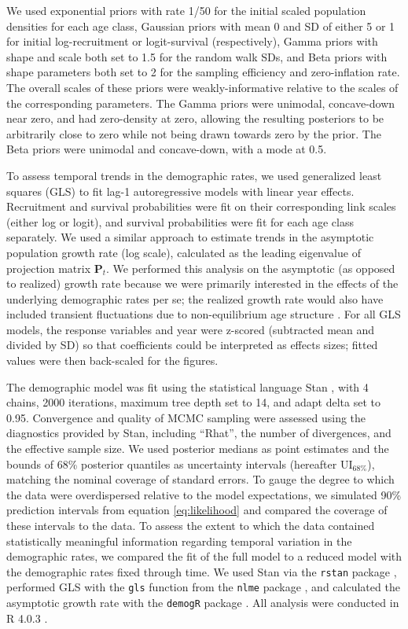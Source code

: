 \documentclass[11pt]{article}
\begin{document}
We used exponential priors with rate 1/50 for the initial scaled population densities for
each age class, 
Gaussian priors with mean 0 and SD of either 5 or 1 for 
initial log-recruitment or logit-survival (respectively), 
Gamma priors with shape and scale both set to 1.5 for the random walk SDs,
and Beta priors with shape parameters both set to 2 for the sampling efficiency
and zero-inflation rate.
The overall scales of these priors were weakly-informative relative to the 
scales of the corresponding parameters.
The Gamma priors were unimodal, concave-down near zero, and had zero-density at zero,
allowing the resulting posteriors to be arbitrarily close to zero 
while not being drawn towards zero by the prior.
The Beta priors were unimodal and concave-down, with a mode at 0.5.

To assess temporal trends in the demographic rates, 
we used generalized least squares  (GLS) to fit lag-1 autoregressive models
with linear year effects.
Recruitment and survival probabilities were fit on their corresponding link scales 
(either log or logit),
and survival probabilities were fit for each age class separately.
We used a similar approach to estimate trends in the asymptotic population growth rate
(log scale), 
calculated as the leading eigenvalue of projection matrix $\mathbf{P}_{t}$.
We performed this analysis on the asymptotic (as opposed to realized) growth rate 
because we were primarily interested in the effects 
of the underlying demographic rates per se; 
the realized growth rate would also have included transient fluctuations due to
non-equilibrium age structure \citep{caswell2001matrix}.
For all GLS models, the response variables and year were z-scored 
(subtracted mean and divided by SD) so that coefficients
could be interpreted as effects sizes;
fitted values were then back-scaled for the figures.

The demographic model was fit using the statistical language Stan \citep{carpenter2017stan},
with 4 chains, 2000 iterations, maximum tree depth set to 14, and adapt delta set to 0.95.
Convergence and quality of MCMC sampling were assessed using the diagnostics provided by Stan, 
including ``Rhat'', the number of divergences, and the effective sample size.
We used posterior medians as point estimates 
and the bounds of 68\% posterior quantiles as uncertainty intervals 
(hereafter $\text{UI}_{68\%}$), 
matching the nominal coverage of standard errors.
To gauge the degree to which the data were overdispersed relative 
to the model expectations, 
we simulated 90\% prediction intervals from equation \ref{eq:likelihood} 
and compared the coverage of these intervals to the data.
To assess the extent to which the data contained statistically meaningful information 
regarding temporal variation in the demographic rates,
we compared the fit of the full model to a reduced model with the demographic
rates fixed through time.
We used Stan via the \texttt{rstan} package \citep{stan2020rstan},
performed GLS with the \texttt{gls} function from the \texttt{nlme} package \citep{pinheiro2020nlme}, 
and calculated the asymptotic growth rate with the \texttt{demogR} package \citep{holland2007demogR}.
All analysis were conducted in R 4.0.3 \citep{r2020}. 
\end{document}
